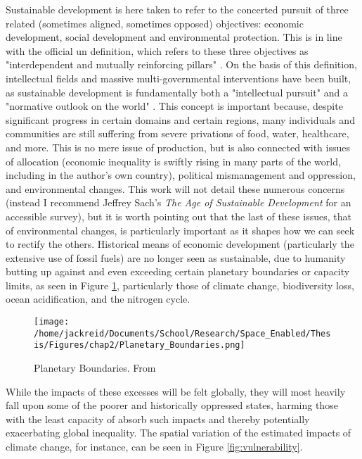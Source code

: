 \documentclass[notitlepage]{article}
\begin{document}
Sustainable development is here taken to refer to the concerted pursuit of three related (sometimes aligned, sometimes opposed) objectives: economic development, social development and environmental protection. This is in line with the official \ac{un} definition, which refers to these three objectives as "interdependent and mutually reinforcing pillars" \cite{worldsummitonsustainabledevelopmentPlanImplementationWorld2002}. On the basis of this definition, intellectual fields and massive multi-governmental interventions have been built, as sustainable development is fundamentally both a "intellectual pursuit" and a "normative outlook on the world" \cite{sachsAgeSustainableDevelopment2015}. This concept is important because, despite significant progress in certain domains and certain regions, many individuals and communities are still suffering from severe privations of food, water, healthcare, and more. This is no mere issue of production, but is also connected with issues of allocation (economic inequality is swiftly rising in many parts of the world, including in the author's own country), political mismanagement and oppression, and environmental changes. This work will not detail these numerous concerns (instead I recommend Jeffrey Sach's \textit{The Age of Sustainable Development} for an accessible survey), but it is worth pointing out that the last of these issues, that of environmental changes, is particularly important as it shapes how we can seek to rectify the others. Historical means of economic development (particularly the extensive use of fossil fuels) are no longer seen as sustainable, due to humanity butting up against and even exceeding certain planetary boundaries or capacity limits, as seen in Figure \ref{fig:boundaries}, particularly those of climate change, biodiversity loss, ocean acidification, and the nitrogen cycle.

\begin{figure}[h]
	\centering
	\texttt{[image: /home/jackreid/Documents/School/Research/Space\_Enabled/Thesis/Figures/chap2/Planetary\_Boundaries.png]}
	\caption[Planetary Boundaries]{Planetary Boundaries. From \cite{rockstromSafeOperatingSpace2009}}
	\label{fig:boundaries}
\end{figure}

While the impacts of these excesses will be felt globally, they will most heavily fall upon some of the poorer and historically oppressed states, harming those with the least capacity of absorb such impacts and thereby potentially exacerbating global inequality. The spatial variation of the estimated impacts of climate change, for instance, can be seen in Figure \ref{fig:vulnerability}.
\end{document}
